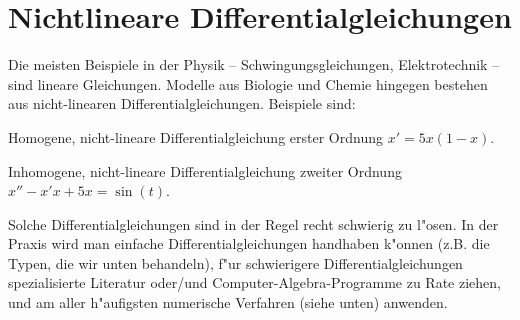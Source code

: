 

\section{Nichtlineare Differentialgleichungen}
\par\medskip
Die meisten Beispiele in der Physik -- Schwingungsgleichungen, Elektrotechnik -- sind lineare Gleichungen. Modelle aus Biologie und Chemie hingegen
 bestehen aus nicht-linearen Differentialgleichungen. 
Beispiele sind:

\begin{bspX}
Homogene, nicht-lineare Differentialgleichung erster Ordnung
$ x' = 5x(1-x)$.
\end{bspX}
\begin{bspX}
Inhomogene, nicht-lineare Differentialgleichung zweiter Ordnung
$ x'' - x'x + 5x = \sin(t)$.
\end{bspX}
Solche Differentialgleichungen sind in der Regel recht schwierig zu l"osen. In
der Praxis wird man einfache Differentialgleichungen handhaben k"onnen 
(z.B. die Typen, die wir unten behandeln), f"ur schwierigere Differentialgleichungen 
spezialisierte Literatur oder/und  Computer-Algebra-Programme zu Rate ziehen, und 
am aller h"aufigsten numerische Verfahren (siehe unten) anwenden.
